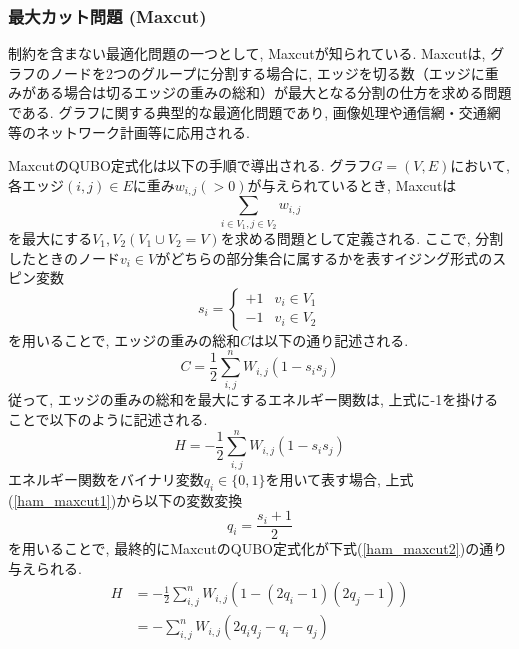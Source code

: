 \documentclass[submit,techrep,noauthor]{ipsj}
\begin{document}
\subsubsection{最大カット問題 (Maxcut)}
制約を含まない最適化問題の一つとして, Maxcutが知られている. Maxcutは, グラフのノードを2つのグループに分割する場合に, エッジを切る数（エッジに重みがある場合は切るエッジの重みの総和）が最大となる分割の仕方を求める問題である. グラフに関する典型的な最適化問題であり, 画像処理や通信網・交通網等のネットワーク計画等に応用される.

MaxcutのQUBO定式化は以下の手順で導出される. グラフ$G=(V, E)$において, 各エッジ$(i, j)\in E$に重み$w_{i,j}(>0)$が与えられているとき, Maxcutは
\begin{equation}
\sum_{i\in V_{1}, j\in V_{2}}w_{i,j}
\end{equation}
を最大にする$V_{1}, V_{2} (V_{1}\cup V_{2}=V)$を求める問題として定義される. ここで, 分割したときのノード$v_{i}\in V$がどちらの部分集合に属するかを表すイジング形式のスピン変数
\begin{equation}  \label{eq: cases f}
s_{i} =
    \begin{cases}
        +1   &   \text{$v_{i}\in V_{1}$}  \\
        -1   &   \text{$v_{i}\in V_{2}$}
    \end{cases}
\end{equation}
を用いることで, エッジの重みの総和$C$は以下の通り記述される.
\begin{equation}
C = \frac{1}{2}\sum_{i,j}^{n}W_{i,j}(1-s_{i}s_{j})
\end{equation}
従って, エッジの重みの総和を最大にするエネルギー関数は, 上式に-1を掛けることで以下のように記述される.
\begin{equation}
H = - \frac{1}{2}\sum_{i,j}^{n}W_{i,j}(1-s_{i}s_{j}) \label{ham_maxcut1}
\end{equation}
エネルギー関数をバイナリ変数$q_{i}\in\{0, 1\}$を用いて表す場合, 上式(\ref{ham_maxcut1})から以下の変数変換
\begin{equation}
q_{i} = \frac{s_{i}+1}{2}
\end{equation}
を用いることで, 最終的にMaxcutのQUBO定式化が下式(\ref{ham_maxcut2})の通り与えられる. 
\begin{align}
H &= - \frac{1}{2}\sum_{i,j}^{n}W_{i,j}(1-(2q_{i}-1)(2q_{j}-1)) \label{ham_maxcut2} \nonumber\\
  &= - \sum_{i,j}^{n}W_{i,j}(2q_{i}q_{j}-q_{i}-q_{j})
\end{align}

\end{document}
